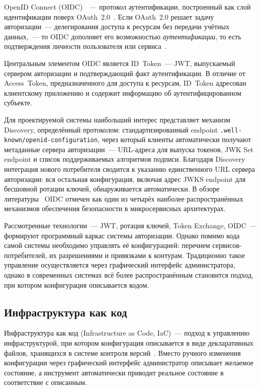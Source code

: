 OpenID Connect (OIDC)~\cite{OpenIDConnect}~--- протокол аутентификации,
построенный как слой идентификации поверх OAuth~2.0~\cite{RFC6749}.
Если OAuth~2.0 решает задачу авторизации~---
делегирования доступа к ресурсам без передачи учётных данных,~---
то OIDC дополняет его возможностью \emph{аутентификации},
то есть подтверждения личности пользователя или сервиса~\cite{Aldea2025}.

Центральным элементом OIDC является ID~Token~---
JWT, выпускаемый сервером авторизации и подтверждающий факт аутентификации.
В отличие от Access~Token, предназначенного для доступа к ресурсам,
ID~Token адресован клиентскому приложению
и содержит информацию об аутентифицированном субъекте.

Для проектируемой системы наибольший интерес представляет
механизм Discovery, определённый протоколом:
стандартизированный endpoint \texttt{.well-known/openid-configuration},
через который клиенты автоматически получают метаданные сервера авторизации~---
URL-адреса для выпуска токенов, JWK Set endpoint
и список поддерживаемых алгоритмов подписи.
Благодаря Discovery интеграция нового потребителя сводится к указанию
единственного URL сервера авторизации:
вся остальная конфигурация, включая адрес JWKS endpoint
для бесшовной ротации ключей, обнаруживается автоматически.
В обзоре литературы~\cite{Almeida2022} OIDC отмечен
как один из четырёх наиболее распространённых механизмов
обеспечения безопасности в микросервисных архитектурах.

Рассмотренные технологии~--- JWT, ротация ключей, Token Exchange, OIDC~---
формируют программный каркас системы авторизации.
Однако помимо кода самой системы необходимо управлять её конфигурацией:
перечнем сервисов-потребителей, их разрешениями и привязками к контурам.
Традиционно такое управление осуществляется через графический интерфейс администратора,
однако в современных системах всё более распространённым становится
подход, при котором конфигурация описывается кодом.

\subsection{Инфраструктура как код}\label{subsec:iac}

Инфраструктура как код (Infrastructure as Code, IaC)~---
подход к управлению инфраструктурой,
при котором конфигурация описывается в виде декларативных файлов,
хранящихся в системе контроля версий~\cite{HashiCorpTerraform}.
Вместо ручного изменения конфигурации через графический интерфейс
администратор описывает желаемое состояние,
а инструмент автоматически приводит реальное состояние в соответствие с описанным.

